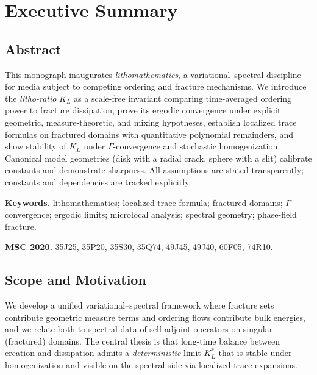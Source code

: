 
\chapter*{Executive Summary}
\label{ch:executive-summary}

\section*{Abstract}
This monograph inaugurates \emph{lithomathematics}, a variational–spectral discipline for media
subject to competing ordering and fracture mechanisms.
We introduce the \emph{litho-ratio} $K_L$ as a scale-free invariant comparing time-averaged
ordering power to fracture dissipation, prove its ergodic convergence under explicit geometric,
measure-theoretic, and mixing hypotheses, establish localized trace formulas on fractured domains
with quantitative polynomial remainders, and show stability of $K_L$ under $\Gamma$-convergence
and stochastic homogenization. Canonical model geometries (disk with a radial crack, sphere with a slit)
calibrate constants and demonstrate sharpness. All assumptions are stated transparently; constants
and dependencies are tracked explicitly.

\noindent\textbf{Keywords.}
lithomathematics; localized trace formula; fractured domains; $\Gamma$-convergence;
ergodic limits; microlocal analysis; spectral geometry; phase-field fracture.

\noindent\textbf{MSC 2020.}
35J25, 35P20, 35S30, 35Q74, 49J45, 49J40, 60F05, 74R10.

\section*{Scope and Motivation}
We develop a unified variational–spectral framework where fracture sets contribute
geometric measure terms and ordering flows contribute bulk energies, and we relate both
to spectral data of self-adjoint operators on singular (fractured) domains.
The central thesis is that long-time balance between creation and dissipation admits a
\emph{deterministic} limit $K_L^*$ that is stable under homogenization and visible on the
spectral side via localized trace expansions.

